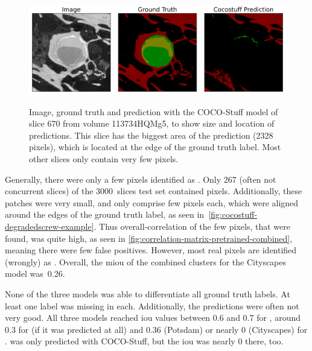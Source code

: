 \begin{figure}[!htb]
    \centering
    \includegraphics[width=\textwidth]{pictures/experiment_1/113734HQMg5_direction0_slice0670_cocostuff_prediction_with_degraded_screw_prediction}\\
    \caption[Degraded Screw Prediction of COCO-Stuff]{Image, ground truth and prediction with the COCO-Stuff model of slice 670 from volume 113734HQMg5, to show size and location of  predictions. This slice has the biggest area of the  prediction (2328 pixels), which is located at the edge of the ground truth label. Most other slices only contain very few pixels.}
    \label{fig:cocostuff-degradedscrew-example}
\end{figure}

Generally, there were only a few pixels identified as .
Only 267 (often not concurrent slices) of the 3000~slices test set contained  pixels.
Additionally, these patches were very small, and only comprise few pixels each, which were aligned around the edges of the ground truth label, as seen in~\autoref{fig:cocostuff-degradedscrew-example}.
Thus overall-correlation of the few pixels, that were found, was quite high, as seen in \autoref{fig:correlation-matrix-pretrained-combined}, meaning there were few false positives.
However, most real  pixels are identified (wrongly) as .
Overall, the \gls{miou} of the combined clusters for the Cityscapes model was~0.26.
\afterpage{\FloatBarrier}

None of the three models was able to differentiate all ground truth labels.
At least one label was missing in each.
Additionally, the predictions were often not very good.
All three models reached \gls{iou} values between 0.6 and 0.7 for , around 0.3 for  (if it was predicted at all) and 0.36 (Potsdam) or nearly 0 (Cityscapes) for .
 was only predicted with COCO-Stuff, but the \gls{iou} was nearly 0 there, too.


